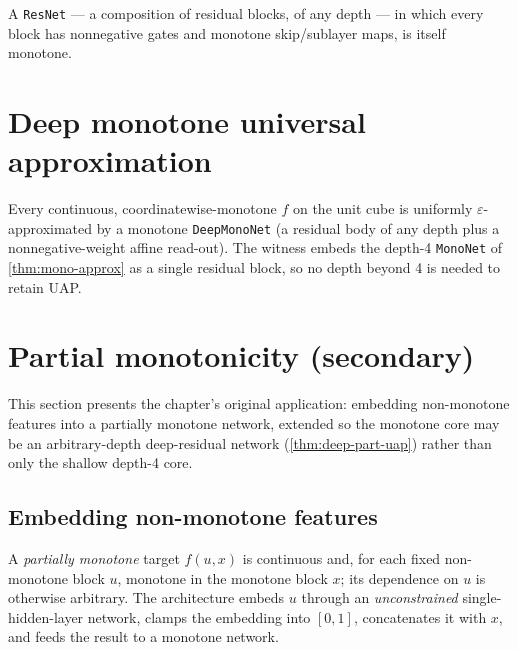 \begin{theorem}\label{thm:resnet-mono}
  \leanok
  A \texttt{ResNet} --- a composition of residual blocks, of any depth --- in which every block has
  nonnegative gates and monotone skip/sublayer maps, is itself monotone.
\end{theorem}

\section{Deep monotone universal approximation}\label{sec:deep-uap}

\begin{theorem}\label{thm:deep-mono-uap}
  \leanok
  Every continuous, coordinatewise-monotone $f$ on the unit cube is uniformly
  $\varepsilon$-approximated by a monotone \texttt{DeepMonoNet} (a residual body of any depth plus a
  nonnegative-weight affine read-out). The witness embeds the depth-4 \texttt{MonoNet} of
  \cref{thm:mono-approx} as a single residual block, so no depth beyond 4 is needed to retain UAP.
\end{theorem}

\section{Partial monotonicity (secondary)}\label{sec:partial-mono}

This section presents the chapter's original application: embedding non-monotone features into a
partially monotone network, extended so the monotone core may be an arbitrary-depth deep-residual
network (\cref{thm:deep-part-uap}) rather than only the shallow depth-4 core.

\subsection{Embedding non-monotone features}

A \emph{partially monotone} target $f(u,x)$ is continuous and, for each fixed non-monotone block
$u$, monotone in the monotone block $x$; its dependence on $u$ is otherwise arbitrary. The
architecture embeds $u$ through an \emph{unconstrained} single-hidden-layer network, clamps the
embedding into $[0,1]$, concatenates it with $x$, and feeds the result to a monotone network.

